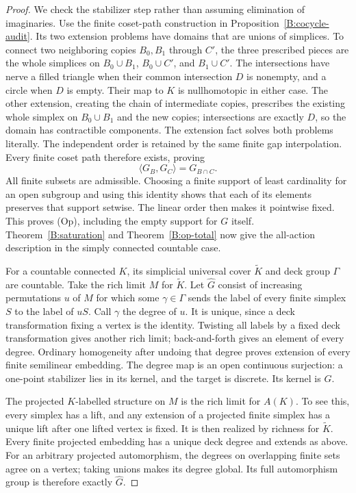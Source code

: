 \begin{proof}
We check the stabilizer step rather than assuming elimination
of imaginaries. Use the finite coset-path construction in
Proposition~\ref{B:cocycle-audit}. Its two extension problems
have domains that are unions of simplices. To connect two
neighboring copies $B_0,B_1$ through $C'$, the three
prescribed pieces are the whole simplices on
$B_0\cup B_1$, $B_0\cup C'$, and $B_1\cup C'$.
The intersections have nerve a filled triangle when their
common intersection $D$ is nonempty, and a circle when
$D$ is empty. Their map to $K$ is nullhomotopic in either
case. The other extension, creating the chain of intermediate
copies, prescribes the existing whole simplex on
$B_0\cup B_1$ and the new copies; intersections are exactly
$D$, so the domain has contractible components. The extension
fact solves both problems literally. The independent order
is retained by the same finite gap interpolation. Every
finite coset path therefore exists, proving
\[
 \langle G_B,G_C\rangle=G_{B\cap C}.
\]
All finite subsets are admissible. Choosing a finite support
of least cardinality for an open subgroup and using this
identity shows that each of its elements preserves that
support setwise. The linear order then makes it pointwise
fixed. This proves (Op), including the empty support for
$G$ itself. Theorem~\ref{B:saturation} and
Theorem~\ref{B:op-total} now give the all-action description
in the simply connected countable case.

For a countable connected $K$, its simplicial universal cover
$\widetilde K$ and deck group $\Gamma$ are countable.
Take the rich limit $M$ for $\widetilde K$. Let
$\widehat G$ consist of increasing permutations $u$ of $M$
for which some $\gamma\in\Gamma$ sends the label of every
finite simplex $S$ to the label of $uS$. Call $\gamma$ the
degree of $u$. It is unique, since a deck transformation
fixing a vertex is the identity. Twisting all labels by a
fixed deck transformation gives another rich limit;
back-and-forth gives an element of every degree. Ordinary
homogeneity after undoing that degree proves extension of
every finite semilinear embedding. The degree map is an
open continuous surjection: a one-point stabilizer lies in
its kernel, and the target is discrete. Its kernel is $G$.

The projected $K$-labelled structure on $M$ is the rich limit
for $A(K)$. To see this, every simplex has a lift, and any
extension of a projected finite simplex has a unique lift
after one lifted vertex is fixed. It is then realized by
richness for $\widetilde K$. Every finite projected
embedding has a unique deck degree and extends as above.
For an arbitrary projected automorphism, the degrees on
overlapping finite sets agree on a vertex; taking unions
makes its degree global. Its full automorphism group is
therefore exactly $\widehat G$.


\end{proof}
